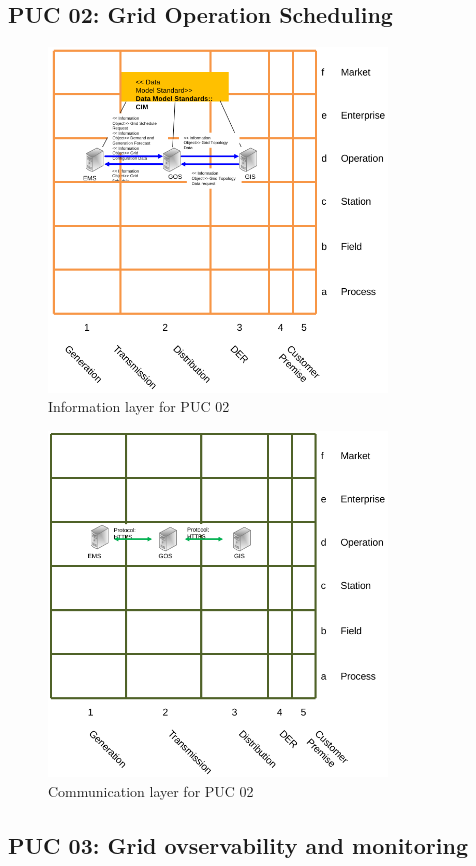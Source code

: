 \subsection{PUC 02: Grid Operation Scheduling}


\begin{figure}[!htb]\centering
  \includegraphics[width=9.0cm]{Data/i2.png}
\caption{Information layer for PUC 02}
\label{fig:i2}
\end{figure}


\begin{figure}[!htb]\centering
  \includegraphics[width=9.0cm]{Data/c2.png}
\caption{Communication layer for PUC 02}
\label{fig:c2}
\end{figure}



\clearpage
\newpage
\subsection{PUC 03: Grid ovservability and monitoring}


